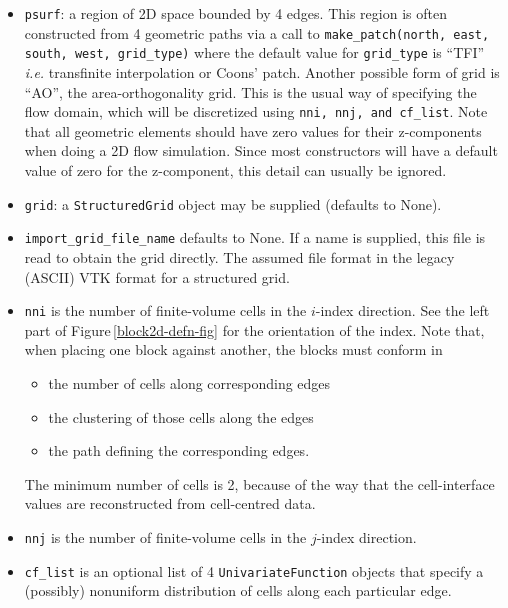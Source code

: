 \begin{itemize}
\item \texttt{psurf}: a region of 2D space bounded by 4 edges.
    This region is often constructed from 4 geometric paths via a call to
    \texttt{make\_patch(north, east, south, west, grid\_type)} where the
    default value for \texttt{grid\_type} is ``TFI'' \textit{i.e.} transfinite interpolation
    or Coons' patch.
    Another possible form of grid is ``AO'', the area-orthogonality grid.
    This is the usual way of specifying the flow domain, which will be discretized 
    using \texttt{nni, nnj, and cf\_list}.
    Note that all geometric elements should have zero values for their z-components when
    doing a 2D flow simulation.
    Since most constructors will have a default value of zero for the z-component, this
    detail can usually be ignored.
\item \texttt{grid}: a \texttt{StructuredGrid} object may be supplied (defaults to None). 
\item \texttt{import\_grid\_file\_name} defaults to None.
  If a name is supplied, this file is read to obtain the grid directly.
  The assumed file format in the legacy (ASCII) VTK format for a structured grid.
\item \texttt{nni} is the number of finite-volume cells in the $i$-index
  direction. See the left part of Figure\,\ref{block2d-defn-fig} for the orientation of the index.
  Note that, when placing one block against another, the blocks must conform in
  \begin{itemize}
    \item the number of cells along corresponding edges
    \item the clustering of those cells along the edges
    \item the path defining the corresponding edges.
  \end{itemize}
  The minimum number of cells is 2, because of the way that the cell-interface values are 
  reconstructed from cell-centred data.
\item \texttt{nnj} is the number of finite-volume cells in the $j$-index direction.
\item \texttt{cf\_list} \label{cflist-item} is an optional list of 4 \texttt{UnivariateFunction} objects
  that specify a (possibly) nonuniform distribution of cells along each particular edge.

\end{itemize}
